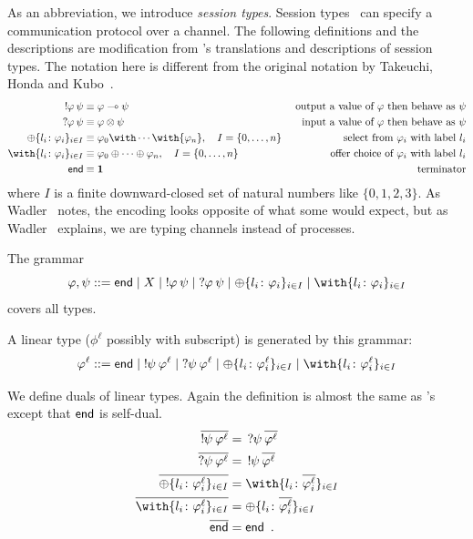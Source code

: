     As an abbreviation, we introduce \textit{session
    types}.
    Session types~\cite{interaction,honda-session} can specify a communication
    protocol over a channel.
    The following definitions and the descriptions are modification from
    \citet{wadler2012propositions}'s translations and descriptions of
    session types.  The notation here is different from the
    original notation by Takeuchi, Honda and Kubo~\citep{interaction}.
    \begin{align*}
     \sendtype\phi\psi&\equiv \phi\limp\psi &\text{
     output a value of $\phi$ then behave as $\psi$} \\
     \recvtype\phi\psi&\equiv \phi\otimes\psi &\text{input a value of
     $\phi$ then behave as $\psi$}\\
     \oplus\{l_i\colon \phi_i\}_{i\in I} &\equiv {\phi_0}\with
     \cdots \with {\phi_n}, \quad I = \{0,\ldots,n\} & \text{select from
     $\phi_i$ with label $l_i$}\\
     \with\{l_i\colon \phi_i\}_{i\in I} &\equiv {\phi_0}\oplus
     \cdots \oplus {\phi_n}, \quad I = \{0,\ldots,n\}& \text{offer choice of
     $\phi_i$ with label $l_i$}
     \\
     \terminate &\equiv \one &\text{terminator}
    \end{align*}
    where $I$ is a finite downward-closed set of natural numbers like
    $\{0,1,2,3\}$.
    As Wadler~\citep{wadler2012propositions} notes, the encoding looks
    opposite of what some would expect, but as
    Wadler~\citep{wadler2012propositions} explains, we are
    typing channels instead of processes.

    The grammar
    \[
     \phi,\psi ::= \terminate\mid X \mid \sendtype\phi\psi \mid
     \recvtype\phi\psi
     \mid \oplus\{l_i\colon\phi_i\}_{i\in I}
     \mid \with\{l_i\colon\phi_i\}_{i\in I}
    \]
    covers all types.

    A linear type ($\phi^\ell$ possibly with subscript) is generated by
    this grammar:
    \[
     \phi^\ell ::= \terminate\mid
     \sendtype{\psi}{\phi^\ell} \mid
     \recvtype{\psi}{\phi^\ell}
     \mid \oplus\{l_i\colon\phi^\ell_i\}_{i\in I}
     \mid \with\{l_i\colon\phi^\ell_i\}_{i\in I}
    \]

    We define duals of linear types.
    Again the definition is almost the
    same as \citet{wadler2012propositions}'s except that $\mathsf{end}$ is
    self-dual.
    \begin{align*}
     \overline{\sendtype\psi{\phi^\ell}}&= \,\recvtype\psi{\overline{\phi^\ell}}\\
     \overline{\recvtype\psi{\phi^\ell}}&= \,\sendtype\psi{\overline{\phi^\ell}}\\
     \overline{\oplus\{l_i\colon \phi^\ell_i\}_{i\in I}} &=
     \with\{l_i\colon \overline{\phi^\ell_i}\}_{i\in I} \\
     \overline{\with\{l_i\colon \phi^\ell_i\}_{i\in I}} &=
     \oplus\{l_i\colon \overline{\phi^\ell_i}\}_{i\in I} \\
     \overline{\terminate} &= \terminate\enspace.
    \end{align*}

